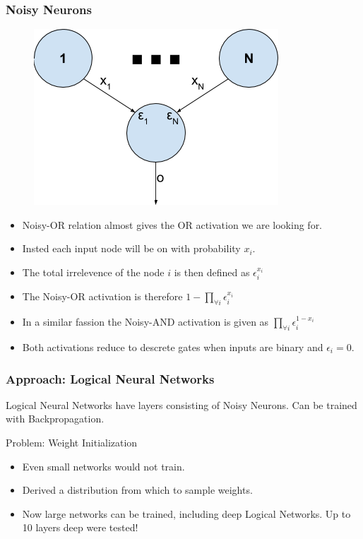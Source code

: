 \documentclass[]{beamer}
\begin{document}
\begin{frame}
\frametitle{Noisy Neurons}

\begin{figure}
\centering
	\begin{minipage}[b]{0.4\textwidth}
		\includegraphics[width=\textwidth]{Images/NoisyNeuronEG.png}
	\end{minipage}
	\hfill
\end{figure}

\begin{itemize}
\item Noisy-OR relation almost gives the OR activation we are looking for.
\item Insted each input node will be on with probability $x_i$.
\item The total irrelevence of the node $i$ is then defined as $\epsilon_i^{x_i}$
\item The Noisy-OR activation is therefore $1 - \prod_{\forall i} \epsilon_i^{x_i}$
\item In a similar fassion the Noisy-AND activation is given as $\prod_{\forall i} \epsilon_i^{1 - x_i}$
\item Both activations reduce to descrete gates when inputs are binary and $\epsilon_i = 0$.
\end{itemize}


\end{frame}

\begin{frame}
\frametitle{Approach: Logical Neural Networks}
Logical Neural Networks have layers consisting of Noisy Neurons. Can be trained with Backpropagation.

\begin{block}{Problem: Weight Initialization}
\begin{itemize}
\item Even small networks would not train.
\item Derived a distribution from which to sample weights.
\item Now large networks can be trained, including deep Logical Networks. Up to 10 layers deep were tested!
\end{itemize}
\end{block}

\end{frame}
\end{document}
